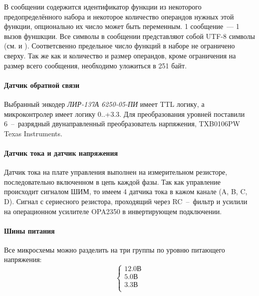 В сообщении содержится идентификатор функции из некоторого предопределённого
набора и некоторое количество операндов нужных этой функции, опционально их
число может быть переменным.
1 сообщение~--- 1 вызов фуншкции.
Все символы в сообщении представляют собой UTF-8 символы
(см. \cite{ISO_IEC_10646_2012} и \cite{rfc3629}). Соответсвенно предельное число
функций в наборе не ограничено сверху. Так же как и количество и размер
операндов, кроме ограничения на размер всего сообщения, необходимо уложиться в
251 байт.

\paragraph{Датчик обратной связи}
Выбранный энкодер \textit{ЛИР-137А 6250-05-ПИ} имеет TTL логику, а
микроконтролер имеет логику 0..+3.3. Для преобразования уровней поставили
6~--~разрядный двунаправленный преобразователь нарпяжения,
TXB0106PW \foreignlanguage{english}{Texas Instruments}.

\paragraph{Датчик тока и датчик напряжения}
Датчик тока на плате управления выполнен на измерительном резисторе,
последовательно включенном в цепь каждой фазы. Так как управление происходит
сигналом ШИМ, то имеем 4 датчика тока в кажом канале (A, B, C, D).
Сигнал с сериесного резистора, проходящий через RC~--~фильтр и усилили на
операционном усилителе OPA2350 в инвертирующем подключении.

\paragraph{Шины питания}
Все микросхемы можно разделить на три группы по уровню питающего напряжения:
$$
    \left\{
    \begin{aligned}
        12.0 \text{В} \\
        5.0  \text{В} \\
        3.3  \text{В} \\
    \end{aligned}
    \right.
$$

